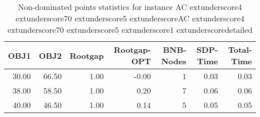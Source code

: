 \begin{table}
\caption{Non-dominated points statistics for instance AC	extunderscore4	extunderscore70	extunderscore5	extunderscoreAC	extunderscore4	extunderscore70	extunderscore5	extunderscore1	extunderscoredetailed}
\label{tab:stats/AC_4_70_5_AC_4_70_5_1_detailed}
\begin{tabular}{rrrrrrr}
\toprule
OBJ1 & OBJ2 & Rootgap & Rootgap-OPT & BNB-Nodes & SDP-Time & Total-Time \\
\midrule
30.00 & 66.50 & 1.00 & -0.00 & 1 & 0.03 & 0.03 \\
38.00 & 58.50 & 1.00 & 0.20 & 7 & 0.06 & 0.06 \\
40.00 & 46.50 & 1.00 & 0.14 & 5 & 0.05 & 0.05 \\
\bottomrule
\end{tabular}
\end{table}
